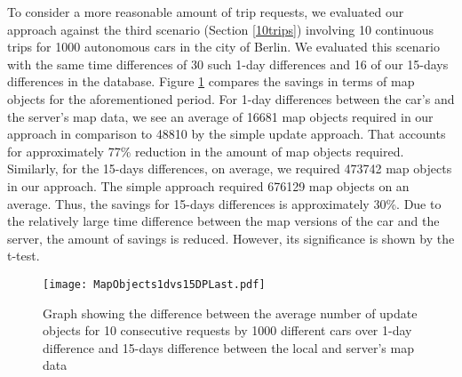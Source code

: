 To consider a more reasonable amount of trip requests, we evaluated our approach against the third scenario (Section \ref{10trips}) involving 10 continuous trips for 1000 autonomous cars in the city of Berlin. We evaluated this scenario with the same time differences of 30 such 1-day differences and 16 of our 15-days differences in the database. Figure \ref{fg:ber10x1000mo} compares the savings in terms of map objects for the aforementioned period. For 1-day differences between the car's and the server's map data, we see an average of 16681 map objects required in our approach in comparison to 48810 by the simple update approach. That accounts for approximately 77\% reduction in the amount of map objects required. Similarly, for the 15-days differences, on average, we required 473742 map objects in our approach. The simple approach required 676129 map objects on an average. Thus, the savings for 15-days differences is approximately 30\%. Due to the relatively large time difference between the map versions of the car and the server, the amount of savings is reduced. However, its significance is shown by the t-test.  

\begin{figure}
\centering
\texttt{[image: MapObjects1dvs15DPLast.pdf]}
\caption{Graph showing the difference between the average number of update objects for 10 consecutive requests by 1000 different cars over 1-day difference and 15-days difference between the local and server's map data }
\label{fg:ber10x1000mo}
\end{figure}

  





